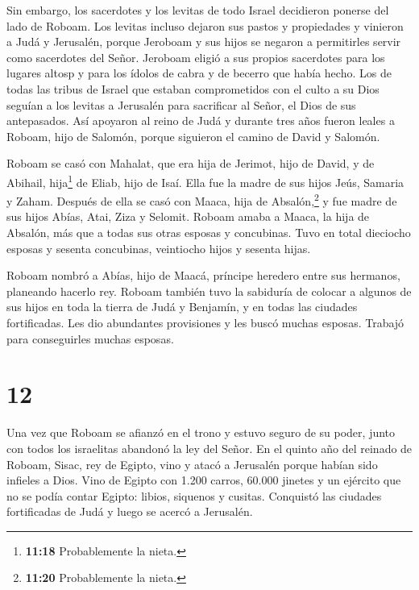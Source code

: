  Sin embargo, los sacerdotes y los levitas de todo Israel
decidieron ponerse del lado de Roboam.  Los levitas incluso
dejaron sus pastos y propiedades y vinieron a Judá y Jerusalén, porque
Jeroboam y sus hijos se negaron a permitirles servir como sacerdotes del
Señor.  Jeroboam eligió a sus propios sacerdotes para los
lugares altosp y para los ídolos de cabra y de becerro que había hecho.
 Los de todas las tribus de Israel que estaban
comprometidos con el culto a su Dios seguían a los levitas a Jerusalén
para sacrificar al Señor, el Dios de sus antepasados.  Así
apoyaron al reino de Judá y durante tres años fueron leales a Roboam,
hijo de Salomón, porque siguieron el camino de David y Salomón.

 Roboam se casó con Mahalat, que era hija de Jerimot, hijo
de David, y de Abihail, hija\footnote{\textbf{11:18} Probablemente la
  nieta.} de Eliab, hijo de Isaí.  Ella fue la madre de sus
hijos Jeús, Samaria y Zaham.  Después de ella se casó con
Maaca, hija de Absalón,\footnote{\textbf{11:20} Probablemente la nieta.}
y fue madre de sus hijos Abías, Atai, Ziza y Selomit. 
Roboam amaba a Maaca, la hija de Absalón, más que a todas sus otras
esposas y concubinas. Tuvo en total dieciocho esposas y sesenta
concubinas, veintiocho hijos y sesenta hijas.

 Roboam nombró a Abías, hijo de Maacá, príncipe heredero
entre sus hermanos, planeando hacerlo rey.  Roboam también
tuvo la sabiduría de colocar a algunos de sus hijos en toda la tierra de
Judá y Benjamín, y en todas las ciudades fortificadas. Les dio
abundantes provisiones y les buscó muchas esposas. Trabajó para
conseguirles muchas esposas.

\hypertarget{section-11}{%
\section{12}\label{section-11}}

 Una vez que Roboam se afianzó en el trono y estuvo seguro
de su poder, junto con todos los israelitas abandonó la ley del Señor.
 En el quinto año del reinado de Roboam, Sisac, rey de
Egipto, vino y atacó a Jerusalén porque habían sido infieles a Dios.
 Vino de Egipto con 1.200 carros, 60.000 jinetes y un
ejército que no se podía contar Egipto: libios, siquenos y cusitas.
 Conquistó las ciudades fortificadas de Judá y luego se
acercó a Jerusalén.

